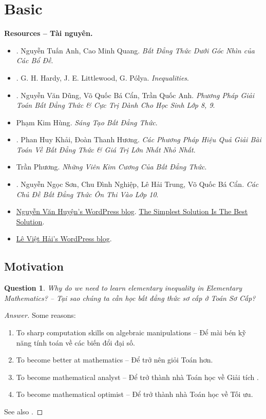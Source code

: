 \documentclass{article}
\newtheorem{question}{Question}
\begin{document}
\section{Basic}
\textbf{\textsf{Resources -- Tài nguyên.}}
\begin{itemize}
	\item \cite{Anh_Quang_bdt_lem}. {\sc Nguyễn Tuấn Anh, Cao Minh Quang}. {\it Bất Đẳng Thức Dưới Góc Nhìn của Các Bổ Đề}.
	\item \cite{Hardy_Littlewood_Polya1952}. {\sc G. H. Hardy, J. E. Littlewood, G. P\'{o}lya}. {\it Inequalities}.
	\item \cite{Dung_Can_Anh_bdt_8_9}. {\sc Nguyễn Văn Dũng, Võ Quốc Bá Cẩn, Trần Quốc Anh}. {\it Phương Pháp Giải Toán Bất Đẳng Thức \& Cực Trị Dành Cho Học Sinh Lớp 8, 9}.
	\item {\sc Phạm Kim Hùng}. {\it Sáng Tạo Bất Đẳng Thức}.
	\item \cite{Khai_Huong_bdt}. {\sc Phan Huy Khải, Đoàn Thanh Hương}. {\it Các Phương Pháp Hiệu Quả Giải Bài Toán Về Bất Đẳng Thức \& Giá Trị Lớn Nhất Nhỏ Nhất}.
	\item {\sc Trần Phương}. {\it Những Viên Kim Cương Của Bất Đẳng Thức}.
	\item \cite{Son_Nghiep_Trung_Can_bdt}. {\sc Nguyễn Ngọc Sơn, Chu Đình Nghiệp, Lê Hải Trung, Võ Quốc Bá Cẩn}. {\it Các Chủ Đề Bất Đẳng Thức Ôn Thi Vào Lớp 10}.
	\item \href{https://nguyenhuyenag.wordpress.com/}{{\sc Nguyễn Văn Huyện}'s WordPress blog}. \href{https://mathifc.wordpress.com/}{The Simplest Solution Is The Best Solution}.
	\item \href{https://leviethai.wordpress.com}{{\sc Lê Việt Hải}'s WordPress blog}.
\end{itemize}

\subsection{Motivation}

\begin{question}
	Why do we need to learn elementary inequality in Elementary Mathematics? -- Tại sao chúng ta cần học bất đẳng thức sơ cấp ở Toán Sơ Cấp?
\end{question}

\begin{proof}[Answer]
	Some reasons:
	\begin{enumerate}
		\item To sharp computation skills on algebraic manipulations -- Để mài bén kỹ năng tính toán về các biến đổi đại số.
		\item To become better at mathematics -- Để trở nên giỏi Toán hơn.
		\item To become mathematical analyst -- Để trở thành nhà Toán học về Giải tích .
		\item To become mathematical optimist -- Để trở thành nhà Toán học về Tối ưu.
	\end{enumerate}
	See also \cite{Tao2007}.
\end{proof}
\end{document}
